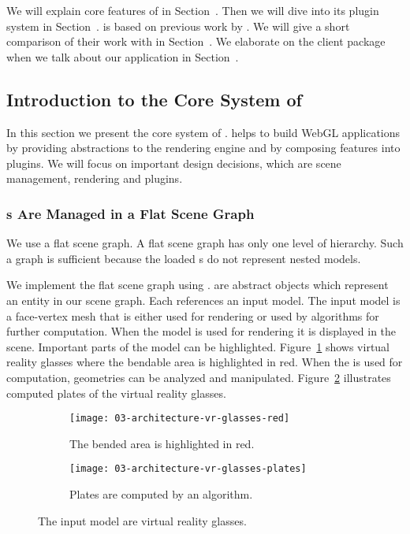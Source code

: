 \documentclass[../../ClassicThesis.tex]{subfiles}
\begin{document}
We will explain core features of {\convertify} in
Section~. Then we will dive into
its plugin system in Section~. {\convertify} is
based on previous work by \citet{bachelor-thesis}. We will give a
short comparison of their work with {\convertify} in
Section~. We elaborate on the client
package when we talk about our application {\platener} in
Section~.

\subsection{Introduction to the Core System of {\convertify}}
\label{sec:convertify-core-features}

In this section we present the core system of {\convertify}.
{\convertify} helps to build WebGL applications by providing
abstractions to the rendering engine and by composing
features into plugins. We will focus on important design
decisions, which are scene management, rendering and
plugins.

\subsubsection{{\threedmodel}s Are Managed in a Flat Scene
  Graph}

We use a flat scene graph. A flat scene graph has only one
level of hierarchy. Such a graph is sufficient because the
loaded {\stlfile}s do not represent nested models.

We implement the flat scene graph using .
 are abstract objects which represent an entity
in our scene graph. Each  references an input
model. The input model is a face-vertex mesh that is either
used for rendering or used by algorithms for further
computation. When the model is used for rendering it is
displayed in the scene. Important parts of the model can be
highlighted. Figure~\ref{fig:vr-glasses:red} shows virtual
reality glasses where the bendable area is highlighted in
red. When the {\threedmodel} is used for computation,
geometries can be analyzed and manipulated.
Figure~\ref{fig:vr-glasses:plates} illustrates computed
plates of the virtual reality glasses.

\begin{figure}[h]
  \centering
  \begin{subfigure}[b]{0.49\textwidth}
    \texttt{[image: 03-architecture-vr-glasses-red]}
    \caption{The bended area is highlighted in red.}
    \label{fig:vr-glasses:red}
  \end{subfigure}
  \begin{subfigure}[b]{0.49\textwidth}
    \texttt{[image: 03-architecture-vr-glasses-plates]}
    \caption{Plates are computed by an algorithm.}
    \label{fig:vr-glasses:plates}
  \end{subfigure}
  \caption{The input model are virtual reality glasses.}
  \label{fig:vr-glasses}
\end{figure}
\end{document}
